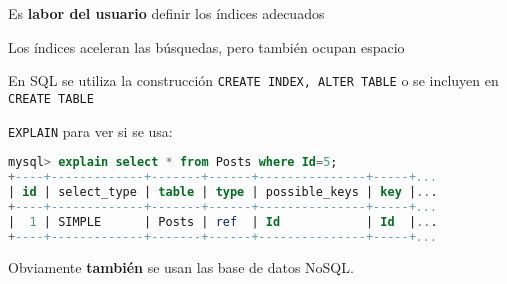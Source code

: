 Es \textbf{labor del usuario} definir los índices adecuados

Los índices aceleran las búsquedas, pero también ocupan espacio

En SQL se utiliza la construcción \texttt{CREATE INDEX, ALTER TABLE} o se incluyen en \texttt{CREATE TABLE}

\texttt{EXPLAIN} para ver si se usa:

\begin{lstlisting}[language=sql]
mysql> explain select * from Posts where Id=5;
+----+-------------+-------+------+---------------+-----+...
| id | select_type | table | type | possible_keys | key |...
+----+-------------+-------+------+---------------+-----+...
|  1 | SIMPLE      | Posts | ref  | Id            | Id  |...
+----+-------------+-------+------+---------------+-----+...
\end{lstlisting}
Obviamente \textbf{también} se usan las base de datos NoSQL.

